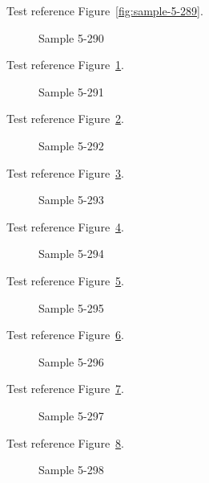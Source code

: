 Test reference Figure~\ref{fig:sample-5-289}.

\begin{figure}[tbhp]
\caption{Sample 5-290}
\label{fig:sample-5-290}
\end{figure}

Test reference Figure~\ref{fig:sample-5-290}.

\begin{figure}[tbhp]
\caption{Sample 5-291}
\label{fig:sample-5-291}
\end{figure}

Test reference Figure~\ref{fig:sample-5-291}.

\begin{figure}[tbhp]
\caption{Sample 5-292}
\label{fig:sample-5-292}
\end{figure}

Test reference Figure~\ref{fig:sample-5-292}.

\begin{figure}[tbhp]
\caption{Sample 5-293}
\label{fig:sample-5-293}
\end{figure}

Test reference Figure~\ref{fig:sample-5-293}.

\begin{figure}[tbhp]
\caption{Sample 5-294}
\label{fig:sample-5-294}
\end{figure}

Test reference Figure~\ref{fig:sample-5-294}.

\begin{figure}[tbhp]
\caption{Sample 5-295}
\label{fig:sample-5-295}
\end{figure}

Test reference Figure~\ref{fig:sample-5-295}.

\begin{figure}[tbhp]
\caption{Sample 5-296}
\label{fig:sample-5-296}
\end{figure}

Test reference Figure~\ref{fig:sample-5-296}.

\begin{figure}[tbhp]
\caption{Sample 5-297}
\label{fig:sample-5-297}
\end{figure}

Test reference Figure~\ref{fig:sample-5-297}.

\begin{figure}[tbhp]
\caption{Sample 5-298}
\label{fig:sample-5-298}
\end{figure}

